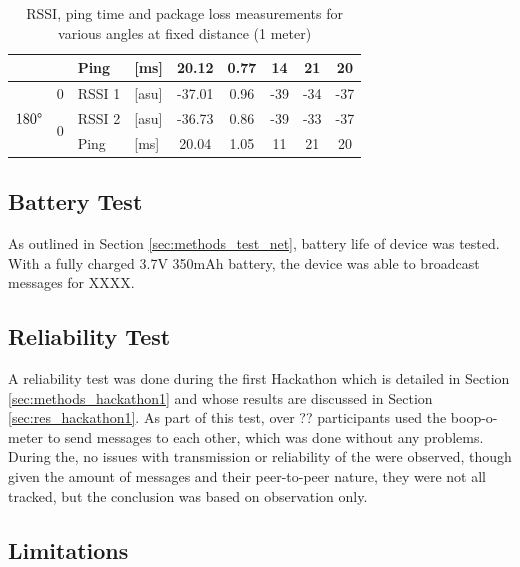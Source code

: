\begin{table}[H]
\begin{tabular}{|c|c|l|l|c|c|c|c|c|}
        && Ping & [ms] & 20.12 & 0.77 & 14 & 21 & 20 \\\hline\hline
        \multirow{3}{*}{$180\degree$} & \multirow{1}{*}{0} & RSSI 1 & [asu] & -37.01 & 0.96 & -39 & -34 & -37 \\\cline{2-9}\cline{2-9}
        & \multirow{2}{*}{0} & RSSI 2 & [asu] & -36.73 & 0.86 & -39 & -33 & -37 \\\cline{3-9}
        && Ping & [ms] & 20.04 & 1.05 & 11 & 21 & 20 \\\hline
    \end{tabular}
    \vspace{\ftspace}
    \caption{RSSI, ping time and package loss measurements for various angles at fixed distance (1 meter)}
    \label{tab:angle_res}
\end{table}

\subsection{\label{sec:res_battery}Battery Test}

As outlined in Section \ref{sec:methods_test_net}, battery life of device was tested. With a fully charged 3.7V 350mAh battery, the device was able to broadcast messages for XXXX.

\subsection{\label{sec:res_reliability}Reliability Test}
A reliability test was done during the first Hackathon which is detailed in Section \ref{sec:methods_hackathon1} and whose results are discussed in Section \ref{sec:res_hackathon1}. As part of this test, over ?? participants used the boop-o-meter to send messages to each other, which was done without any problems. During the, no issues with transmission or reliability of the were observed, though given the amount of messages and their peer-to-peer nature, they were not all tracked, but the conclusion was based on observation only.

\subsection{\label{sec:res_limitations}Limitations}

